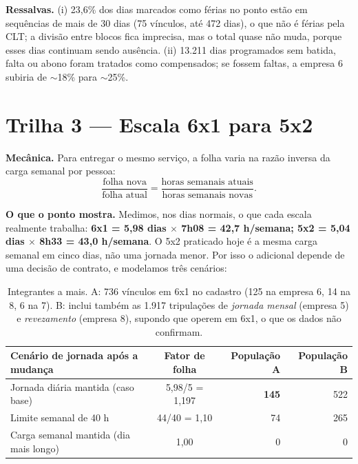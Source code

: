 \documentclass[11pt,a4paper]{article}
\begin{document}
\textbf{Ressalvas.} (i) 23,6\% dos dias marcados como férias no ponto estão em sequências de mais de 30 dias (75 vínculos, até 472 dias), o que não é férias pela CLT; a divisão entre blocos fica imprecisa, mas o total quase não muda, porque esses dias continuam sendo ausência. (ii) 13.211 dias programados sem batida, falta ou abono foram tratados como compensados; se fossem faltas, a empresa 6 subiria de $\sim$18\% para $\sim$25\%.

\section{Trilha 3 --- Escala 6x1 para 5x2}\label{sec:t3}
\textbf{Mecânica.} Para entregar o mesmo serviço, a folha varia na razão inversa da carga semanal por pessoa:
\[ \frac{\text{folha nova}}{\text{folha atual}} = \frac{\text{horas semanais atuais}}{\text{horas semanais novas}}. \]

\textbf{O que o ponto mostra.} Medimos, nos dias normais, o que cada escala realmente trabalha: \textbf{6x1 = 5,98 dias $\times$ 7h08 = 42,7 h/semana; 5x2 = 5,04 dias $\times$ 8h33 = 43,0 h/semana}. O 5x2 praticado hoje é a mesma carga semanal em cinco dias, não uma jornada menor. Por isso o adicional depende de uma decisão de contrato, e modelamos três cenários:

\begin{table}[h]
\centering\small
\begin{tabular}{lcrr}
\toprule
Cenário de jornada após a mudança & Fator de folha & População A & População B \\
\midrule
Jornada diária mantida (caso base) & 5,98/5 = 1,197 & \textbf{145} & 522 \\
Limite semanal de 40 h & 44/40 = 1,10 & 74 & 265 \\
Carga semanal mantida (dia mais longo) & 1,00 & 0 & 0 \\
\bottomrule
\end{tabular}
\caption{Integrantes a mais. A: 736 vínculos em 6x1 no cadastro (125 na empresa 6, 14 na 8, 6 na 7). B: inclui também as 1.917 tripulações de \emph{jornada mensal} (empresa 5) e \emph{revezamento} (empresa 8), supondo que operem em 6x1, o que os dados não confirmam.}
\end{table}
\end{document}
